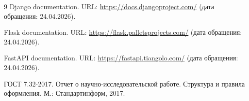 \documentclass[14pt, a4paper]{extarticle}
\begin{document}
\pagestyle{plain}
\setcounter{tocdepth}{2}




\clearpage

\tableofcontents




\clearpage

\clearpage

\clearpage


\clearpage


\begin{thebibliography}{9}
    Django documentation. URL: \url{https://docs.djangoproject.com/} (дата обращения: 24.04.2026).

    Flask documentation. URL: \url{https://flask.palletsprojects.com/} (дата обращения: 24.04.2026).

    FastAPI documentation. URL: \url{https://fastapi.tiangolo.com/} (дата обращения: 24.04.2026).

    ГОСТ 7.32-2017. Отчет о научно-исследовательской работе. Структура и правила оформления. М.: Стандартинформ, 2017.
\end{thebibliography}

% 
\end{document}
